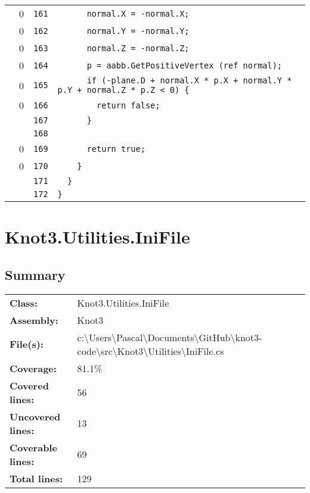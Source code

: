 \documentclass[a4paper,10pt]{article}
\begin{document}
\begin{longtable}[l]{lrrl}
\cellcolor{red} & 0 & \verb~161~ & \verb~      normal.X = -normal.X;~\\
\cellcolor{red} & 0 & \verb~162~ & \verb~      normal.Y = -normal.Y;~\\
\cellcolor{red} & 0 & \verb~163~ & \verb~      normal.Z = -normal.Z;~\\
\cellcolor{red} & 0 & \verb~164~ & \verb~      p = aabb.GetPositiveVertex (ref normal);~\\
\cellcolor{red} & 0 & \verb~165~ & \verb~      if (-plane.D + normal.X * p.X + normal.Y * p.Y + normal.Z * p.Z < 0) {~\\
\cellcolor{red} & 0 & \verb~166~ & \verb~        return false;~\\
\cellcolor{gray} &  & \verb~167~ & \verb~      }~\\
\cellcolor{gray} &  & \verb~168~ & \verb~~\\
\cellcolor{red} & 0 & \verb~169~ & \verb~      return true;~\\
\cellcolor{red} & 0 & \verb~170~ & \verb~    }~\\
\cellcolor{gray} &  & \verb~171~ & \verb~  }~\\
\cellcolor{gray} &  & \verb~172~ & \verb~}~\\
\end{longtable}
\newpage
\section{Knot3.Utilities.IniFile}
\subsection{Summary}
\begin{longtable}[l]{ll}
\textbf{Class:} & Knot3.Utilities.IniFile\\
\textbf{Assembly:} & Knot3\\
\textbf{File(s):} & \begin{minipage}[t]{12cm}{c:\textbackslash Users\textbackslash Pascal\textbackslash Documents\textbackslash GitHub\textbackslash knot3-code\textbackslash src\textbackslash Knot3\textbackslash Utilities\textbackslash IniFile.cs}\end{minipage} \\
\textbf{Coverage:} & 81.1\%\\
\textbf{Covered lines:} & 56\\
\textbf{Uncovered lines:} & 13\\
\textbf{Coverable lines:} & 69\\
\textbf{Total lines:} & 129\\
\end{longtable}
\end{document}
